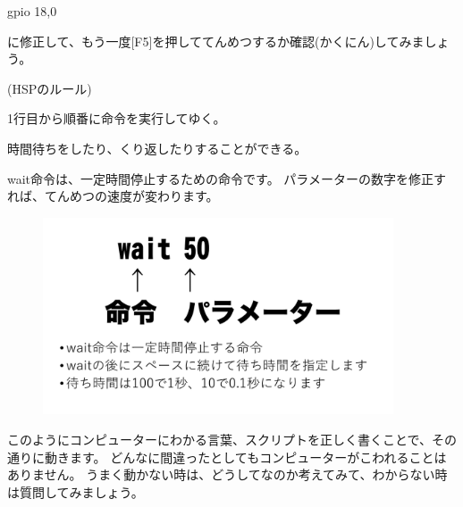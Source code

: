\begin{description}
    \item gpio 18,0
\end{description}
\noindent
に修正して、もう一度[F5]を押しててんめつするか確認(かくにん)してみましょう。

\begin{description}
    \item (HSPのルール)
\end{description}

\begin{description}
    \item 1行目から順番に命令を実行してゆく。
    \item 時間待ちをしたり、くり返したりすることができる。
\end{description}

wait命令は、一定時間停止するための命令です。
パラメーターの数字を修正すれば、てんめつの速度が変わります。

\begin{figure}[H]
    \begin{center}
        \includegraphics[keepaspectratio,width=10.372cm,height=5.837cm]{text02-img/text02-img026.png}
    \end{center}
\end{figure}
\noindent
このようにコンピューターにわかる言葉、スクリプトを正しく書くことで、その通りに動きます。
どんなに間違ったとしてもコンピューターがこわれることはありません。
うまく動かない時は、どうしてなのか考えてみて、わからない時は質問してみましょう。

